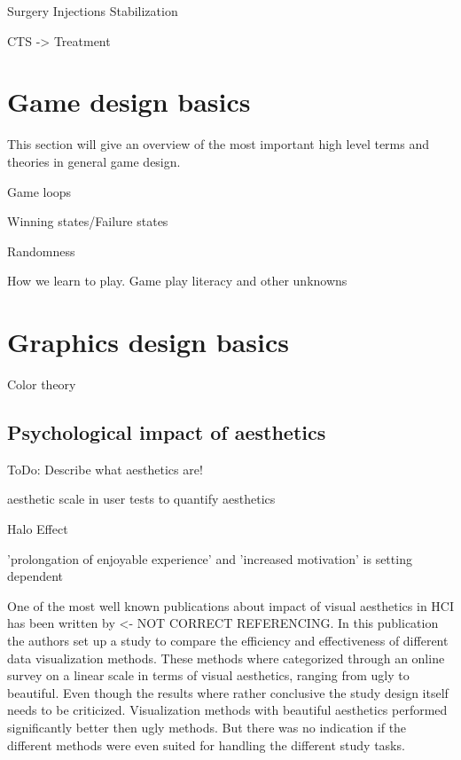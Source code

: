 Surgery
Injections
Stabilization

\gls{CTS} -> Treatment \cite{van2007repetitive}


\section{Game design basics}

This section will give an overview of the most important high level terms and theories in general game design.

Game loops

Winning states/Failure states

Randomness

How we learn to play. Game play literacy and other unknowns


\section{Graphics design basics}

Color theory

\subsection{Psychological impact of aesthetics}

ToDo: Describe what aesthetics are!

aesthetic scale in user tests to quantify aesthetics

Halo Effect

'prolongation of enjoyable experience' and 'increased motivation' is setting dependent \cite{sonderegger2010influence}

One of the most well known publications about impact of visual aesthetics in \gls{HCI} has been written by  <- NOT CORRECT REFERENCING.
In this publication the authors set up a study to compare the efficiency and effectiveness of different data visualization methods.
These methods where categorized through an online survey on a linear scale in terms of visual aesthetics, ranging from ugly to beautiful.
Even though the results where rather conclusive the study design itself needs to be criticized.
Visualization methods with beautiful aesthetics performed significantly better then ugly methods. 
But there was no indication if the different methods were even suited for handling the different study tasks.

